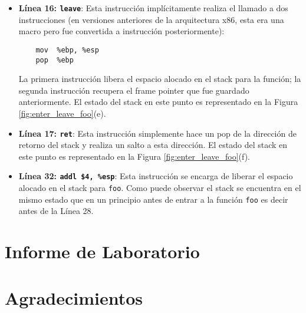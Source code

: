 \begin{itemize}
\item \textbf{Línea 16: \texttt{leave}}: Esta instrucción implícitamente realiza el llamado a dos instrucciones (en versiones anteriores de la arquitectura x86, esta era una macro pero fue convertida a instrucción posteriormente):
\begin{verbatim}
    mov  %ebp, %esp
    pop  %ebp
\end{verbatim}
La primera instrucción libera el espacio alocado en el stack para la función; la segunda instrucción recupera el frame pointer que fue guardado anteriormente.
El estado del stack en este punto es representado en la Figura  \ref{fig:enter_leave_foo}(e).

\item \textbf{Línea 17: \texttt{ret}}: Esta instrucción simplemente hace un pop de la dirección de retorno del stack y realiza un salto a esta dirección. El estado del stack en este punto es representado en la Figura  \ref{fig:enter_leave_foo}(f).

\item \textbf{Línea 32: \texttt{addl \$4, \%esp}}: Esta instrucción se encarga de liberar el espacio alocado en el stack para {\tt foo}. Como puede observar el stack se encuentra en el mismo estado que en un principio antes de entrar a la función {\tt foo} es decir antes de la Línea 28.

\end{itemize}



\section{Informe de Laboratorio}




\section*{Agradecimientos}






